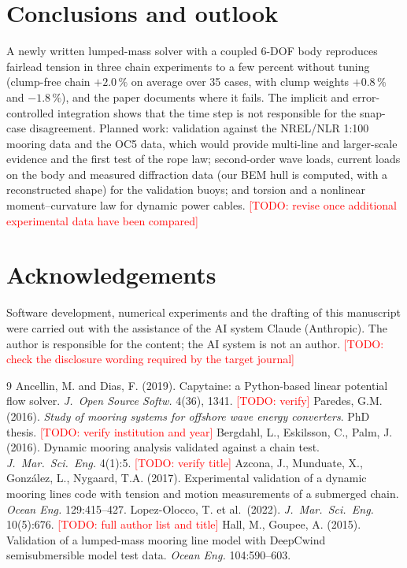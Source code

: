 \documentclass[11pt,a4paper]{article}
\newcommand{\todo}[1]{\textcolor{red}{[TODO: #1]}}
\begin{document}
\section{Conclusions and outlook}
A newly written lumped-mass solver with a coupled 6-DOF body reproduces fairlead tension in three chain experiments to a few percent without tuning (clump-free chain $+2.0\,\%$ on average over 35 cases, with clump weights $+0.8\,\%$ and $-1.8\,\%$), and the paper documents where it fails. The implicit and error-controlled integration shows that the time step is not responsible for the snap-case disagreement. Planned work: validation against the NREL/NLR 1:100 mooring data and the OC5 data, which would provide multi-line and larger-scale evidence and the first test of the rope law; second-order wave loads, current loads on the body and measured diffraction data (our BEM hull is computed, with a reconstructed shape) for the validation buoys; and torsion and a nonlinear moment--curvature law for dynamic power cables. \todo{revise once additional experimental data have been compared}

\section*{Acknowledgements}
Software development, numerical experiments and the drafting of this manuscript were carried out with the assistance of the AI system Claude (Anthropic). The author is responsible for the content; the AI system is not an author. \todo{check the disclosure wording required by the target journal}

\begin{thebibliography}{9}
 Ancellin, M. and Dias, F. (2019). Capytaine: a Python-based linear potential flow solver. \emph{J.\ Open Source Softw.} 4(36), 1341. \todo{verify}
 Paredes, G.M. (2016). \emph{Study of mooring systems for offshore wave energy converters}. PhD thesis. \todo{verify institution and year}
 Bergdahl, L., Eskilsson, C., Palm, J. (2016). Dynamic mooring analysis validated against a chain test. \emph{J.\ Mar.\ Sci.\ Eng.} 4(1):5. \todo{verify title}
 Azcona, J., Munduate, X., Gonz\'alez, L., Nygaard, T.A. (2017). Experimental validation of a dynamic mooring lines code with tension and motion measurements of a submerged chain. \emph{Ocean Eng.} 129:415--427.
 Lopez-Olocco, T. et al.\ (2022). \emph{J.\ Mar.\ Sci.\ Eng.} 10(5):676. \todo{full author list and title}
 Hall, M., Goupee, A. (2015). Validation of a lumped-mass mooring line model with DeepCwind semisubmersible model test data. \emph{Ocean Eng.} 104:590--603.
\end{thebibliography}
\end{document}
